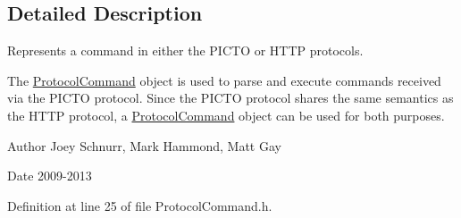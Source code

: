 \subsection{Detailed Description}
Represents a command in either the P\-I\-C\-T\-O or H\-T\-T\-P protocols. 

The \hyperlink{struct_picto_1_1_protocol_command}{Protocol\-Command} object is used to parse and execute commands received via the P\-I\-C\-T\-O protocol. Since the P\-I\-C\-T\-O protocol shares the same semantics as the H\-T\-T\-P protocol, a \hyperlink{struct_picto_1_1_protocol_command}{Protocol\-Command} object can be used for both purposes. \begin{DoxyAuthor}{Author}
Joey Schnurr, Mark Hammond, Matt Gay 
\end{DoxyAuthor}
\begin{DoxyDate}{Date}
2009-\/2013 
\end{DoxyDate}


Definition at line 25 of file Protocol\-Command.\-h.




